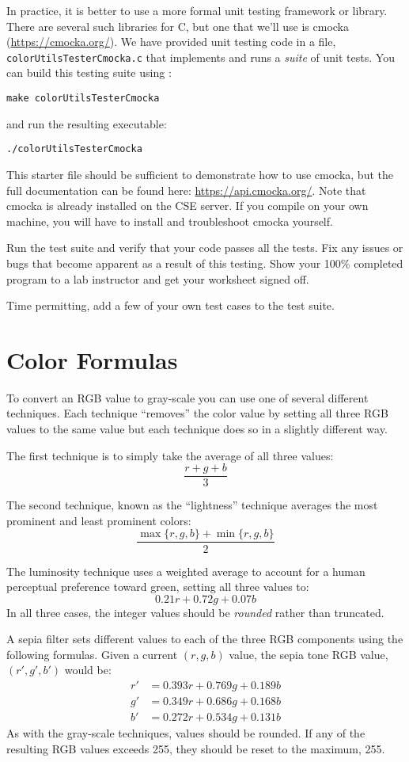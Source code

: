 \documentclass[12pt]{scrartcl}
\begin{document}
In practice, it is better to use a more formal unit testing framework
or library.  There are several such libraries for C, but one that 
we'll use is cmocka (\url{https://cmocka.org/}).  We have provided
unit testing code in a file, \texttt{colorUtilsTesterCmocka.c} 
that implements and runs a \emph{suite} of unit tests. You can 
build this testing suite using :

\texttt{make colorUtilsTesterCmocka}

and run the resulting executable:

\texttt{./colorUtilsTesterCmocka}

This starter file should be 
sufficient to demonstrate how to use cmocka, but the full documentation 
can be found here: \url{https://api.cmocka.org/}.  Note that cmocka 
is already installed on the CSE server.  If you compile on your own 
machine, you will have to install and troubleshoot cmocka yourself.  

Run the test suite and verify that your code passes all the tests.
Fix any issues or bugs that become apparent as a result of this
testing.  Show your 100\% completed program to a lab instructor
and get your worksheet signed off.

Time permitting, add a few of your own test cases to the test
suite.

\section*{Color Formulas}

To convert an RGB value to gray-scale you can use one of several
different techniques.  Each technique ``removes'' the color value by
setting all three RGB values to the same value but each technique 
does so in a slightly different way.

The first technique is to simply take the average of all three values:
  $$\frac{r + g + b}{3}$$

The second technique, known as the ``lightness'' technique averages 
the most prominent and least prominent colors:
  $$\frac{\max\{r, g, b\} + \min\{r, g, b\}}{2}$$

The luminosity technique uses a weighted average to account for a human 
perceptual preference toward green, setting all three values to:
  $$0.21 r + 0.72 g + 0.07 b$$
In all three cases, the integer values should be \emph{rounded} rather 
than truncated.

A sepia filter sets different values to each of the three RGB components 
using the following formulas.  Given a current $(r,g,b)$ value, the sepia
tone RGB value, $(r',g',b')$ would be:
$$\begin{array}{ll}
  r' &= 0.393r + 0.769g + 0.189b \\
  g' &= 0.349r + 0.686g + 0.168b \\
  b' &= 0.272r + 0.534g + 0.131b
\end{array}$$
As with the gray-scale techniques, values should be rounded.  If any of
the resulting RGB values exceeds 255, they should be reset to the 
maximum, 255.
\end{document}
